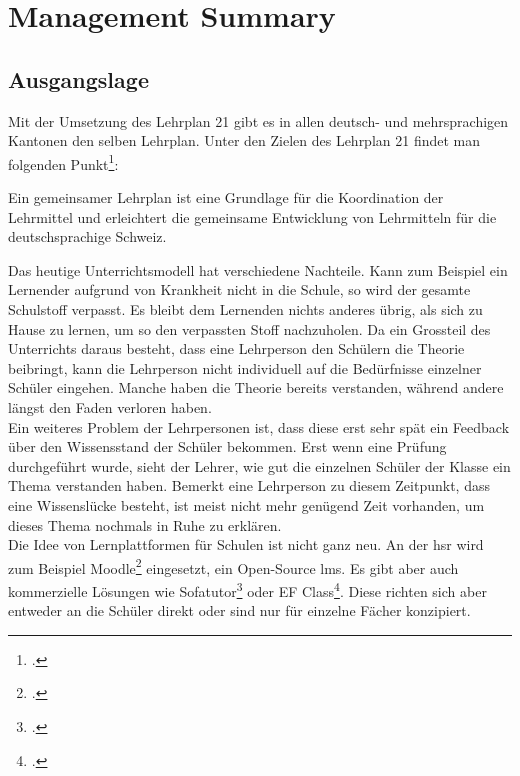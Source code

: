 \section{Management Summary}

\subsection{Ausgangslage}
Mit der Umsetzung des Lehrplan 21 gibt es in allen deutsch- und mehrsprachigen Kantonen den selben Lehrplan. Unter den Zielen des Lehrplan 21 findet man folgenden Punkt\footcite{lp21_ziel}:

\begin{displayquote}
Ein gemeinsamer Lehrplan ist eine Grundlage für die Koordination der Lehrmittel und erleichtert die gemeinsame Entwicklung von Lehrmitteln für die deutschsprachige Schweiz.
\end{displayquote}

Das heutige Unterrichtsmodell hat verschiedene Nachteile. Kann zum Beispiel ein Lernender aufgrund von Krankheit nicht in die Schule, so wird der gesamte Schulstoff verpasst. Es bleibt dem Lernenden nichts anderes übrig, als sich zu Hause zu lernen, um so den verpassten Stoff nachzuholen. Da ein Grossteil des Unterrichts daraus besteht, dass eine Lehrperson den Schülern die Theorie beibringt, kann die Lehrperson nicht individuell auf die Bedürfnisse einzelner Schüler eingehen. Manche haben die Theorie bereits verstanden, während andere längst den Faden verloren haben. \\

Ein weiteres Problem der Lehrpersonen ist, dass diese erst sehr spät ein Feedback über den Wissensstand der Schüler bekommen. Erst wenn eine Prüfung durchgeführt wurde, sieht der Lehrer, wie gut die einzelnen Schüler der Klasse ein Thema verstanden haben. Bemerkt eine Lehrperson zu diesem Zeitpunkt, dass eine Wissenslücke besteht, ist meist nicht mehr genügend Zeit vorhanden, um dieses Thema nochmals in Ruhe zu erklären. \\


Die Idee von Lernplattformen für Schulen ist nicht ganz neu. An der \gls{hsr} wird zum Beispiel Moodle\footcite{moodle_homepage} eingesetzt, ein Open-Source \gls{lms}. Es gibt aber auch kommerzielle Lösungen wie Sofatutor\footcite{sofatutor_homepage} oder EF Class\footcite{ef_class_homepage}. Diese richten sich aber entweder an die Schüler direkt oder sind nur für einzelne Fächer konzipiert. \\

